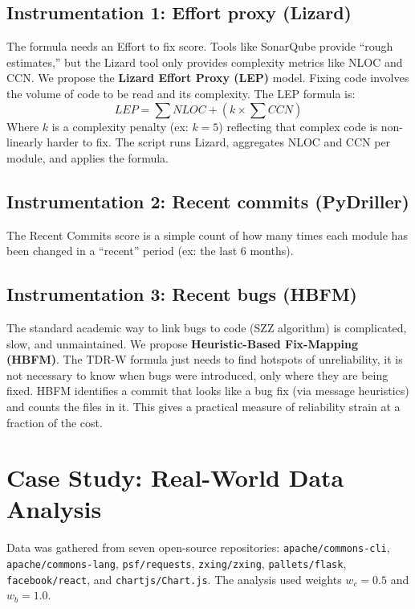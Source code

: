 \documentclass[journal]{IEEEtran}
\begin{document}
\subsection{Instrumentation 1: Effort proxy (Lizard)}
The formula needs an Effort to fix score. Tools like SonarQube provide ``rough estimates,'' but the Lizard tool only provides complexity metrics like NLOC and CCN. We propose the \textbf{Lizard Effort Proxy (LEP)} model. Fixing code involves the volume of code to be read and its complexity. The LEP formula is:
\begin{equation}
LEP = \sum NLOC + (k \times \sum CCN)
\label{eq2}
\end{equation}
Where $k$ is a complexity penalty (ex: $k=5$) reflecting that complex code is non-linearly harder to fix. The script runs Lizard, aggregates NLOC and CCN per module, and applies the formula.

\subsection{Instrumentation 2: Recent commits (PyDriller)}
The Recent Commits score is a simple count of how many times each module has been changed in a ``recent'' period (ex: the last 6 months).

\subsection{Instrumentation 3: Recent bugs (HBFM)}
The standard academic way to link bugs to code (SZZ algorithm) is complicated, slow, and unmaintained. We propose \textbf{Heuristic-Based Fix-Mapping (HBFM)}. The TDR-W formula just needs to find hotspots of unreliability, it is not necessary to know when bugs were introduced, only where they are being fixed. HBFM identifies a commit that looks like a bug fix (via message heuristics) and counts the files in it. This gives a practical measure of reliability strain at a fraction of the cost.

\section{Case Study: Real-World Data Analysis}
Data was gathered from seven open-source repositories: \texttt{apache/commons-cli}, \texttt{apache/commons-lang}, \texttt{psf/requests}, \texttt{zxing/zxing}, \texttt{pallets/flask}, \texttt{facebook/react}, and \texttt{chartjs/Chart.js}. The analysis used weights $w_c = 0.5$ and $w_b = 1.0$.
\end{document}
